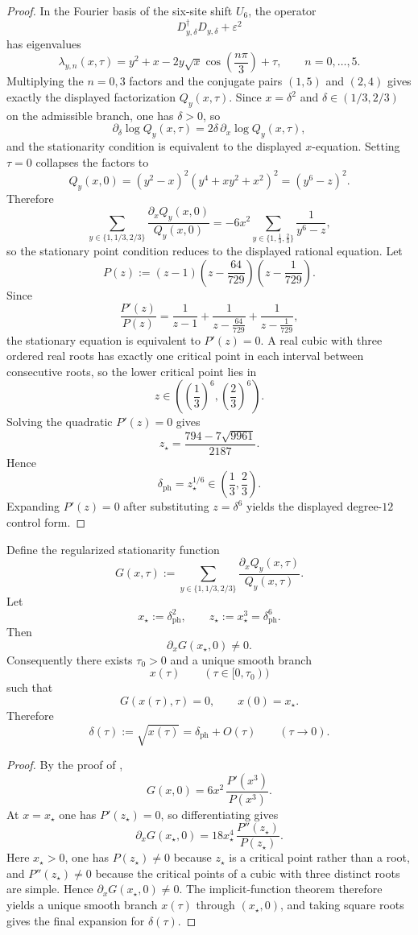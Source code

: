\begin{proof}
In the Fourier basis of the six-site shift $U_6$, the operator
\[
D_{y,\delta}^\dagger D_{y,\delta}+\varepsilon^2
\]
has eigenvalues
\[
\lambda_{y,n}(x,\tau)
=
y^2+x-2y\sqrt{x}\cos\!\left(\frac{n\pi}{3}\right)+\tau,
\qquad n=0,\dots,5.
\]
Multiplying the $n=0,3$ factors and the conjugate pairs $(1,5)$ and $(2,4)$ gives exactly the
displayed factorization $Q_y(x,\tau)$. Since $x=\delta^2$ and $\delta\in(1/3,2/3)$ on the
admissible branch, one has $\delta>0$, so
\[
\partial_\delta\log Q_y(x,\tau)
=
2\delta\,\partial_x\log Q_y(x,\tau),
\]
and the stationarity condition is equivalent to the displayed $x$-equation. Setting $\tau=0$
collapses the factors to
\[
Q_y(x,0)
=(y^2-x)^2(y^4+xy^2+x^2)^2
=(y^6-z)^2.
\]
Therefore
\[
\sum_{y\in\{1,1/3,2/3\}}\frac{\partial_x Q_y(x,0)}{Q_y(x,0)}
=
-6x^2\sum_{y\in\{1,\frac13,\frac23\}}\frac{1}{y^6-z},
\]
so the stationary point condition reduces to the displayed rational equation. Let
\[
P(z):=(z-1)\left(z-\frac{64}{729}\right)\left(z-\frac{1}{729}\right).
\]
Since
\[
\frac{P'(z)}{P(z)}
=
\frac{1}{z-1}
+
\frac{1}{z-\frac{64}{729}}
+
\frac{1}{z-\frac{1}{729}},
\]
the stationary equation is equivalent to $P'(z)=0$. A real cubic with three ordered real roots has
exactly one critical point in each interval between consecutive roots, so the lower critical point
lies in
\[
z\in\left(\left(\frac13\right)^6,\left(\frac23\right)^6\right).
\]
Solving the quadratic $P'(z)=0$ gives
\[
z_\star=\frac{794-7\sqrt{9961}}{2187}.
\]
Hence
\[
\delta_{\mathrm{ph}}=z_\star^{1/6}\in\left(\frac13,\frac23\right).
\]
Expanding $P'(z)=0$ after substituting $z=\delta^6$ yields the displayed degree-$12$ control form.
\end{proof}

\begin{lemma}
\label{lem:regularized-transport-pole-stability}
Define the regularized stationarity function
\[
G(x,\tau):=
\sum_{y\in\{1,1/3,2/3\}}
\frac{\partial_x Q_y(x,\tau)}{Q_y(x,\tau)}.
\]
Let
\[
x_\star:=\delta_{\mathrm{ph}}^2,
\qquad
z_\star:=x_\star^3=\delta_{\mathrm{ph}}^6.
\]
Then
\[
\partial_xG(x_\star,0)\neq 0.
\]
Consequently there exists $\tau_0>0$ and a unique smooth branch
\[
x(\tau)\qquad (\tau\in[0,\tau_0))
\]
such that
\[
G(x(\tau),\tau)=0,
\qquad
x(0)=x_\star.
\]
Therefore
\[
\delta(\tau):=\sqrt{x(\tau)}=\delta_{\mathrm{ph}}+O(\tau)
\qquad (\tau\to 0).
\]
\end{lemma}

\begin{proof}
By the proof of ,
\[
G(x,0)=6x^2\,\frac{P'(x^3)}{P(x^3)}.
\]
At $x=x_\star$ one has $P'(z_\star)=0$, so differentiating gives
\[
\partial_xG(x_\star,0)
=
18x_\star^4\,\frac{P''(z_\star)}{P(z_\star)}.
\]
Here $x_\star>0$, one has $P(z_\star)\neq 0$ because $z_\star$ is a critical point rather than a
root, and $P''(z_\star)\neq 0$ because the critical points of a cubic with three distinct roots are
simple. Hence $\partial_xG(x_\star,0)\neq 0$. The implicit-function theorem therefore yields a
unique smooth branch $x(\tau)$ through $(x_\star,0)$, and taking square roots gives the final
expansion for $\delta(\tau)$.
\end{proof}

